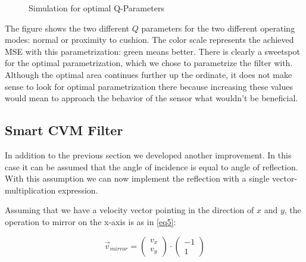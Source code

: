\documentclass[notitlepage, a4paper, 11pt]{scrartcl}
\begin{document}
\begin{multicols}{2}
\begin{figure} [H]
    \centering
    \caption{Simulation for optimal Q-Parameters}
    \label{fig:dyn-sim}
\end{figure}

The figure shows the two different $Q$ parameters for the two different operating modes: normal or proximity to cushion. 
The color scale represents the achieved MSE with this parametrization: green means better.
There is clearly a sweetspot for the optimal parametrization, which we chose to parametrize the filter with.
Although the optimal area continues further up the ordinate, it does not make sense to look for optimal parametrization there
because increasing these values would mean to approach the behavior of the sensor what wouldn't be beneficial.

\subsection{Smart CVM Filter} \label{smart-filter}

In addition to the previous section we developed another improvement. In this case it can be assumed that the angle of incidence is equal to angle of reflection. 
With this assumption we can now implement the reflection with a single vector-multiplication expression. 

Assuming that we have a velocity vector pointing in the direction of $x$ and $y$, the operation to mirror on the x-axis is as in \cref{eq5}:

\begin{equation} 
    \label{eq5}
    \vec{v}_{mirror} = 
    \left(\!
    \begin{array}{c}
      v_x \\
      v_y
    \end{array}
    \!\right) \cdot
    \left(\!
    \begin{array}{c}
        -1 \\
        1
    \end{array}
    \!\right)
\end{equation}


\end{multicols}
\end{document}
